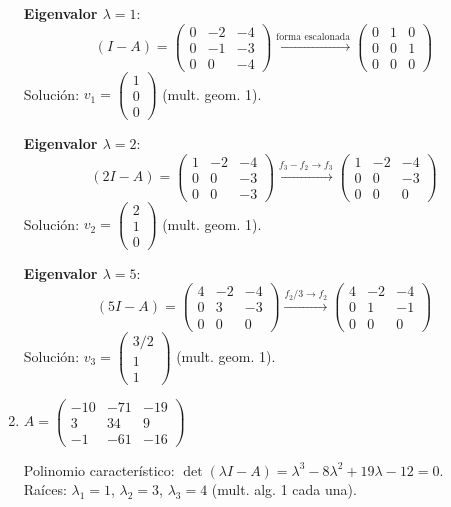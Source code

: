 \begin{prob}
\begin{enumerate}[$a)$]
\begin{myproof}
\textbf{Eigenvalor $\lambda=1$}:
\[
(I - A) = \begin{pmatrix}
0 & -2 & -4 \\
0 & -1 & -3 \\
0 & 0 & -4
\end{pmatrix} \xrightarrow{\text{forma escalonada}} \begin{pmatrix}
0 & 1 & 0 \\
0 & 0 & 1 \\
0 & 0 & 0
\end{pmatrix}
\]
Solución: $v_1 = \begin{pmatrix} 1 \\ 0 \\ 0 \end{pmatrix}$ (mult. geom. 1).

\textbf{Eigenvalor $\lambda=2$}:
\[
(2I - A) = \begin{pmatrix}
1 & -2 & -4 \\
0 & 0 & -3 \\
0 & 0 & -3
\end{pmatrix} \xrightarrow{f_3 - f_2 \to f_3} \begin{pmatrix}
1 & -2 & -4 \\
0 & 0 & -3 \\
0 & 0 & 0
\end{pmatrix}
\]
Solución: $v_2 = \begin{pmatrix} 2 \\ 1 \\ 0 \end{pmatrix}$ (mult. geom. 1).

\textbf{Eigenvalor $\lambda=5$}:
\[
(5I - A) = \begin{pmatrix}
4 & -2 & -4 \\
0 & 3 & -3 \\
0 & 0 & 0
\end{pmatrix} \xrightarrow{f_2/3 \to f_2} \begin{pmatrix}
4 & -2 & -4 \\
0 & 1 & -1 \\
0 & 0 & 0
\end{pmatrix}
\]
Solución: $v_3 = \begin{pmatrix} 3/2 \\ 1 \\ 1 \end{pmatrix}$ (mult. geom. 1).
\end{myproof}
	
	\item $A=\left(\begin{matrix}
-10 & -71 & -19 \\
3 & 34 & 9 \\
-1 & -61 & -16
\end{matrix}\right)$ 
\begin{myproof}
Polinomio característico: $\det(\lambda I - A) = \lambda^3 - 8\lambda^2 + 19\lambda - 12 = 0$. \\
Raíces: $\lambda_1=1$, $\lambda_2=3$, $\lambda_3=4$ (mult. alg. 1 cada una).


\end{myproof}
\end{enumerate}
\end{prob}
